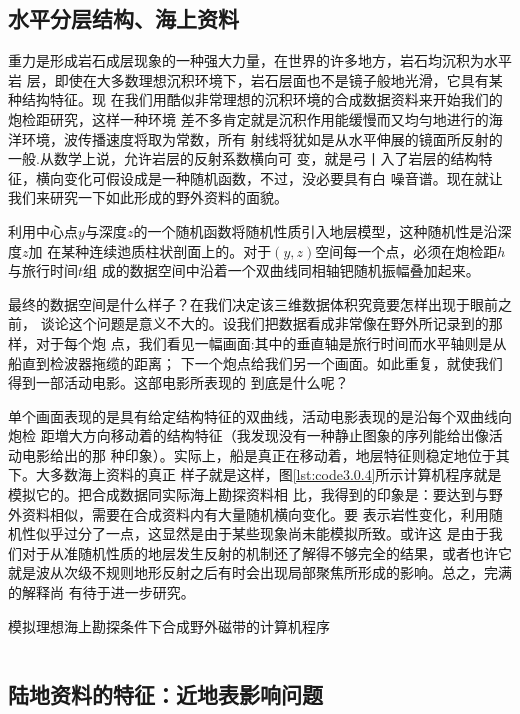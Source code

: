 \subsection{水平分层结构、海上资料}
\label{sec:3.0.3}

重力是形成岩石成层现象的一种强大力量，在世界的许多地方，岩石均沉积为水平岩
层，即使在大多数理想沉积环境下，岩石层面也不是镜子般地光滑，它具有某种结抅特征。现
在我们用酷似非常理想的沉积环境的合成数据资料来开始我们的炮检距研究，这样一种环境
差不多肯定就是沉积作用能缓慢而又均勻地进行的海洋环境，波传播速度将取为常数，所有
射线将犹如是从水平伸展的镜面所反射的一般.从数学上说，允许岩层的反射系数横向可
变，就是弓丨入了岩层的结构特征，横向变化可假设成是一种随机函数，不过，没必要具有白
噪音谱。现在就让我们来研究一下如此形成的野外资料的面貌。

利用中心点$y$与深度$z$的一个随机函数将随机性质引入地层模型，这种随机性是沿深度$z$加
在某种连续迆质柱状剖面上的。对于$(y,z)$空间每一个点，必须在炮检距$h$与旅行时间$t$组
成的数据空间中沿着一个双曲线同相轴钯随机振幅叠加起来。

最终的数据空间是什么样子？在我们决定该三维数据体积究竟要怎样出现于眼前之前，
谈论这个问题是意义不大的。设我们把数据看成非常像在野外所记录到的那样，对于每个炮
点，我们看见一幅画面:其中的垂直轴是旅行时间而水平轴则是从船直到检波器拖缆的距离；
下一个炮点给我们另一个画面。如此重复，就使我们得到一部活动电影。这部电影所表现的
到底是什么呢？

单个画面表现的是具有给定结构特征的双曲线，活动电影表现的是沿每个双曲线向炮检
距増大方向移动着的结构特征（我发现没有一种静止图象的序列能给岀像活动电影给出的那
种印象）。实际上，船是真正在移动着，地层特征则稳定地位于其下。大多数海上资料的真正
样子就是这样，图\ref{lst:code3.0.4}所示计算机程序就是模拟它的。把合成数据同实际海上勘探资料相
比，我得到的印象是：要达到与野外资料相似，需要在合成资料内有大量随机横向变化。要
表示岩性变化，利用随机性似乎过分了一点，这显然是由于某些现象尚未能模拟所致。或许这
是由于我们对于从准随机性质的地层发生反射的机制还了解得不够完全的结果，或者也许它
就是波从次级不规则地形反射之后有时会出现局部聚焦所形成的影响。总之，完满的解释尚
有待于进一步研究。
\begin{listing}[H]
    \caption{模拟理想海上勘探条件下合成野外磁带的计算机程序}
    \inputminted{Fortran}{code-3-0.f90}
    \label{lst:code3.0.4}
\end{listing}

\subsection{陆地资料的特征：近地表影响问题}
\label{sec:3.0.4}

